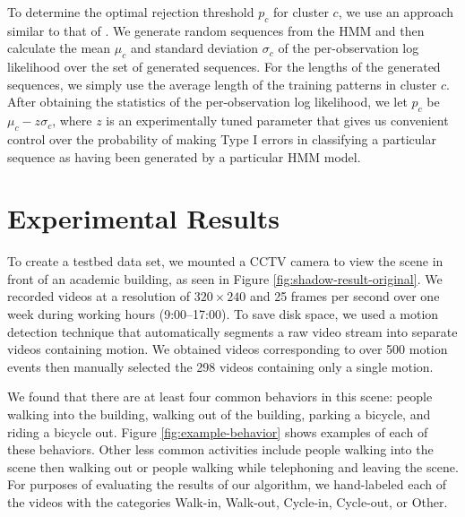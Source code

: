 To determine the optimal rejection threshold $p_c$ for cluster $c$, we
use an approach similar to that of .  We
generate random sequences from the HMM and then calculate the mean
$\mu_c$ and standard deviation $\sigma_c$ of the per-observation log
likelihood over the set of generated sequences.  For the lengths of
the generated sequences, we simply use the average length of the
training patterns in cluster $c$.  After obtaining the statistics of
the per-observation log likelihood, we let $p_c$ be $\mu_c -
z \sigma_c$, where $z$ is an experimentally tuned parameter that gives
us convenient control over the probability of making Type I errors in
classifying a particular sequence as having been generated by a
particular HMM model.

\section{Experimental Results}
\label{sec:clustering-results}

To create a testbed data set, we mounted a CCTV camera to view the
scene in front of an academic building, as seen in
Figure \ref{fig:shadow-result-original}. We recorded videos at a
resolution of $320 \times 240$ and 25 frames per second over one week
during working hours (9:00--17:00). To save disk space, we used a
motion detection technique that automatically segments a raw video
stream into separate videos containing motion. We obtained videos
corresponding to over 500 motion events then manually selected the 298
videos containing only a single motion.

We found that there are at least four common behaviors in this scene:
people walking into the building, walking out of the building, parking
a bicycle, and riding a bicycle out. Figure \ref{fig:example-behavior}
shows examples of each of these behaviors. Other less common
activities include people walking into the scene then walking out or
people walking while telephoning and leaving the scene. For purposes
of evaluating the results of our algorithm, we hand-labeled each of
the videos with the categories Walk-in, Walk-out, Cycle-in, Cycle-out,
or Other.


